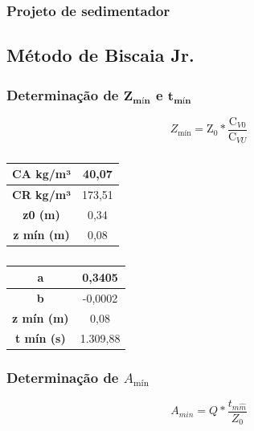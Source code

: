 \subsubsection{Projeto de sedimentador}

\subsection{Método de Biscaia Jr.}

\subsubsection{Determinação de $ \mathbf{Z_{\text{mín}}} $ e $ \mathbf{t_{\text{mín}}} $}


\begin{equation}\label{key}
Z_{\text{mín}} =\mathrm{Z}_{0} * \frac{\mathrm{C}_{V 0}}{\mathrm{C}_{V U}}
\end{equation}

\begin{table}[H]
	\centering
	\begin{tabular}{|c|c|}
		\hline
		\textbf{CA kg/m³} & 40,07 \\ \hline
		\textbf{CR kg/m³} & 173,51 \\ \hline
		\textbf{z0 (m)} & 0,34 \\ \hline
		\textbf{z mín (m)} & 0,08 \\ \hline
	\end{tabular}
	\caption{}
	\label{zmin}
\end{table}



\begin{table}[H]
	\centering
	\begin{tabular}{|c|c|}
		\hline
		\textbf{a} & 0,3405 \\ \hline
		\textbf{b} & -0,0002 \\ \hline
		\textbf{z mín (m)} & 0,08 \\ \hline
		\textbf{t mín (s)} & 1.309,88 \\ \hline
	\end{tabular}
	\caption{}
	\label{tmin}
\end{table}

\subsubsection{Determinação de $ A_{\text{mín}} $}

\begin{equation}\label{key}
A_{m i n}=Q * \frac{t_{m \hat{m}}}{Z_{0}}
\end{equation}

